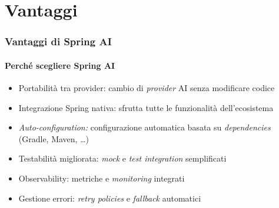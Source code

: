 \section{Vantaggi} %
\label{sec:spring_ai_advantages}
%
\begin{frame}[t,fragile] \frametitle{Vantaggi di Spring AI}
	{\small
		\framesubtitle{Perché scegliere Spring AI}
		\begin{itemize}[leftmargin=10pt,align=right]
			\onslide<1->\item[\alert{\faArrowCircleRight}] \alert{Portabilità tra provider:} cambio di \textit{provider} AI senza modificare codice
			\onslide<2->\item[\alert{\faArrowCircleRight}] \alert{Integrazione Spring nativa:} sfrutta tutte le funzionalità dell'ecosistema
			\onslide<3->\item[\alert{\faArrowCircleRight}] \alert{\textit{Auto-configuration:}} configurazione automatica basata su \textit{dependencies} (Gradle, Maven, \ldots)
			\onslide<4->\item[\alert{\faArrowCircleRight}] \alert{Testabilità migliorata:} \textit{mock} e \textit{test integration} semplificati
			\onslide<5->\item[\alert{\faArrowCircleRight}] \alert{Observability:} metriche e \textit{monitoring} integrati
			\onslide<6->\item[\alert{\faArrowCircleRight}] \alert{Gestione errori:} \textit{retry policies} e \textit{fallback} automatici
		\end{itemize}
	}
\end{frame}
%
